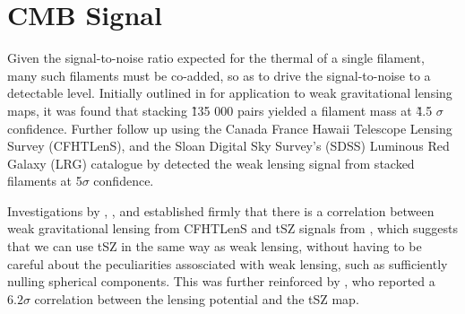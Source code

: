 \section{CMB Signal}


Given the signal-to-noise ratio expected for the thermal \sze of a single filament, many such filaments must be co-added, so as to drive the signal-to-noise to a detectable level. Initially outlined in \cite{2016MNRAS.457.2391C} for application to weak gravitational lensing maps, it was found that stacking \~ 135 000 pairs yielded a filament mass at \~ 4.5 $\sigma$ confidence. Further follow up using the Canada France Hawaii Telescope Lensing Survey (CFHTLenS), and the Sloan Digital Sky Survey's (SDSS) Luminous Red Galaxy (LRG) catalogue by \cite{2017MNRAS.468.2605E} detected the weak lensing signal from stacked filaments at 5$\sigma$ confidence.

Investigations by \cite{2014PhRvD..89b3508V}, \cite{2015JCAP...09..046M}, and \cite{2015JCAP...10..047H} established firmly that there is a correlation between weak gravitational lensing from CFHTLenS and tSZ signals from \planck , which suggests that we can use tSZ in the same way as weak lensing, without having to be careful about the peculiarities assosciated with weak lensing, such as sufficiently nulling spherical components. This was further reinforced by \cite{2014JCAP...02..030H}, who reported a $6.2 \sigma$ correlation between the \planck  lensing potential and the \planck  tSZ map. 
